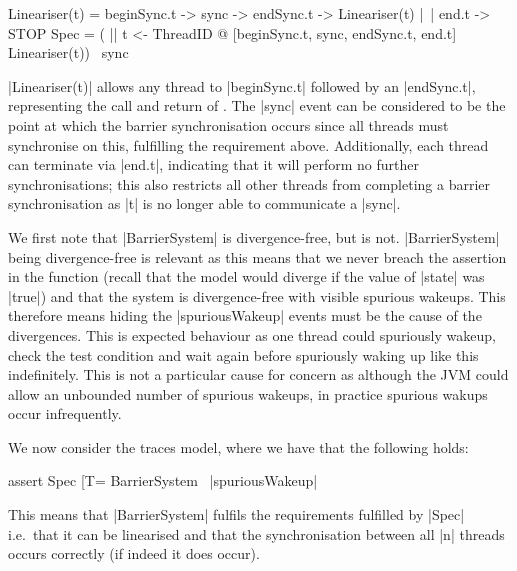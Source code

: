 \begin{cspm}
  Lineariser(t) = beginSync.t -> sync -> endSync.t -> Lineariser(t)
                |~| end.t -> STOP
  Spec = ( || t <- ThreadID @ [{beginSync.t, sync, endSync.t, end.t}] 
               Lineariser(t)) \ {sync}
\end{cspm}

|Lineariser(t)| allows any thread to |beginSync.t| followed by an |endSync.t|, representing the call and return of . The |sync| event can be considered to be the point at which the barrier synchronisation occurs since all threads must synchronise on this, fulfilling the requirement above. Additionally, each thread can terminate via |end.t|, indicating that it will perform no further synchronisations; this also restricts all other threads from completing a barrier synchronisation as |t| is no longer able to communicate a |sync|.

We first note that |BarrierSystem| is divergence-free, but  is not. |BarrierSystem| being divergence-free is relevant as this means that we never breach the assertion in the  function (recall that the model would diverge if the value of |state| was |true|) and that the system is divergence-free with visible spurious wakeups. This therefore means hiding the |spuriousWakeup| events must be the cause of the divergences. This is expected behaviour as one thread could spuriously wakeup, check the test condition and wait again before spuriously waking up like this indefinitely. This is not a particular cause for concern as although the JVM could allow an unbounded number of spurious wakeups, in practice spurious wakups occur infrequently.

We now consider the traces model, where we have that the following holds:
\begin{cspm}
  assert Spec [T= BarrierSystem \ {|spuriousWakeup|}
\end{cspm}
This means that |BarrierSystem| fulfils the requirements fulfilled by |Spec| i.e.~that it can be linearised and that the synchronisation between all |n| threads occurs correctly (if indeed it does occur).

